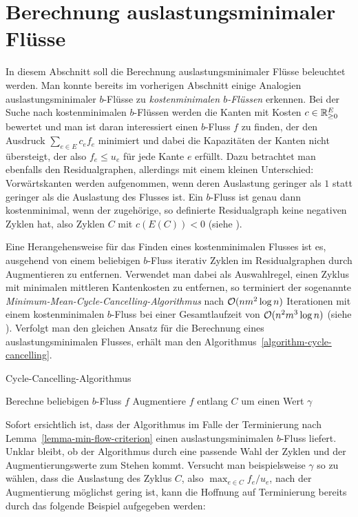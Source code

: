 \section{Berechnung auslastungsminimaler Flüsse}

In diesem Abschnitt soll die Berechnung auslastungsminimaler Flüsse beleuchtet werden.
Man konnte bereits im vorherigen Abschnitt einige Analogien auslastungsminimaler $b$-Flüsse zu \emph{kostenminimalen $b$-Flüssen} erkennen.
Bei der Suche nach kostenminimalen $b$-Flüssen werden die Kanten mit Kosten $c\in\mathbb{R}_{\geq 0}^E$ bewertet und man ist daran interessiert einen $b$-Fluss $f$ zu finden, der den Ausdruck $\sum_{e \in E} c_e f_e$ minimiert und dabei die Kapazitäten der Kanten nicht übersteigt, der also $f_e \leq u_e$ für jede Kante $e$ erfüllt.
Dazu betrachtet man ebenfalls den Residualgraphen, allerdings mit einem kleinen Unterschied: Vorwärtskanten werden aufgenommen, wenn deren Auslastung geringer als $1$ statt geringer als die Auslastung des Flusses ist.
Ein $b$-Fluss ist genau dann kostenminimal, wenn der zugehörige, so definierte Residualgraph keine negativen Zyklen hat, also Zyklen $C$ mit $c(E(C)) < 0$ (siehe \cite[Satz 9.7]{Korte2012}).

Eine Herangehensweise für das Finden eines kostenminimalen Flusses ist es, ausgehend von einem beliebigen $b$-Fluss iterativ Zyklen im Residualgraphen durch Augmentieren zu entfernen.
Verwendet man dabei als Auswahlregel, einen Zyklus mit minimalen mittleren Kantenkosten zu entfernen, so terminiert der sogenannte \emph{Minimum-Mean-Cycle-Cancelling-Algorithmus} nach $\mathcal{O}(nm^2\log n)$ Iterationen mit einem kostenminimalen $b$-Fluss bei einer Gesamtlaufzeit von $\mathcal{O}(n^2m^3 \log n)$ (siehe \cite[Abschnitt 9.3]{Korte2012}).
Verfolgt man den gleichen Ansatz für die Berechnung eines auslastungsminimalen Flusses, erhält man den Algorithmus~\ref{algorithm-cycle-cancelling}.
\begin{algorithm}
	\caption{Cycle-Cancelling-Algorithmus}
	\label{algorithm-cycle-cancelling}
	\begin{algorithmic}[1]
		\State Berechne beliebigen $b$-Fluss $f$
			\State Augmentiere $f$ entlang $C$ um einen Wert $\gamma$
		\EndWhile
		\EndProcedure
	\end{algorithmic}
\end{algorithm}

Sofort ersichtlich ist, dass der Algorithmus im Falle der Terminierung nach Lemma~\ref{lemma-min-flow-criterion} einen auslastungsminimalen $b$-Fluss liefert.
Unklar bleibt, ob der Algorithmus durch eine passende Wahl der Zyklen und der Augmentierungswerte zum Stehen kommt.
Versucht man beispielsweise $\gamma$ so zu wählen, dass die Auslastung des Zyklus $C$, also $\max_{e\in C} f_e / u_e$, nach der Augmentierung möglichst gering ist, kann die Hoffnung auf Terminierung bereits durch das folgende Beispiel aufgegeben werden:

